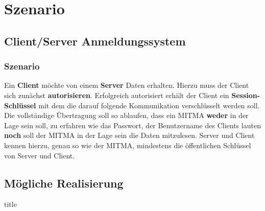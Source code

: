 \section{Szenario}

\subsection{Client/Server Anmeldungssystem}

\begin{frame}[c]

	\frametitle{Szenario}

	Ein \textbf{Client} möchte von einem \textbf{Server} Daten erhalten. 
	Hierzu muss der Client sich zunächst \textbf{autorisieren}.
	Erfolgreich autorisiert erhält der Client ein \textbf{Session-Schlüssel} 
	mit dem die darauf folgende Kommunikation verschlüsselt werden soll.
	Die vollständige Übertragung soll so ablaufen, 
	dass ein MITMA \textbf{weder} in der Lage sein soll, 
	zu erfahren wie das Passwort, der Benutzername 
	des Clients lauten \textbf{noch} soll der MITMA in der Lage 
	sein die Daten mitzulesen. Server und Client kennen hierzu, 
	genau so wie der MITMA, mindestens die öffentlichen Schlüssel von Server und Client.

\end{frame}

\subsection{Mögliche Realisierung}

\begin{frame}[c]
  \vfill
  \centering
  \begin{beamercolorbox}[sep=6pt,center,shadow=true,rounded=true]{title}
    \textbf{\Large{\insertsubsectionhead}}\par%
  \end{beamercolorbox}
  \vfill
\end{frame}

